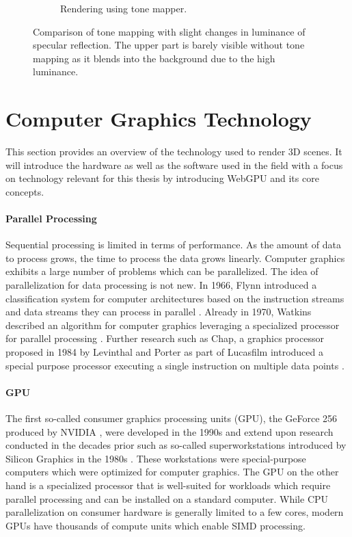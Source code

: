 \begin{figure}[H]
\begin{subfigure}[t]{0.3\textwidth}
    \caption{Rendering using tone mapper.}
    \label{fig:tone-mapping-applied}
  \end{subfigure}
  \hspace*{2cm}
  \caption{Comparison of tone mapping with slight changes in luminance of specular reflection. The upper part is barely visible without tone mapping as it blends into the background due to the high luminance.}
  \label{fig:tone-mapping}
\end{figure}

\section{Computer Graphics Technology}

This section provides an overview of the technology used to render 3D scenes. It will introduce the hardware as well as the software used in the field with a focus on technology relevant for this thesis by introducing WebGPU and its core concepts.

\paragraph{Parallel Processing}

Sequential processing is limited in terms of performance. As the amount of data to process grows, the time to process the data grows linearly. Computer graphics exhibits a large number of problems which can be parallelized. The idea of parallelization for data processing is not new. In 1966, Flynn introduced a classification system for computer architectures based on the instruction streams and data streams they can process in parallel \cite{flynnTaxonomy,flynnTaxonomy2}. Already in 1970, Watkins described an algorithm for computer graphics leveraging a specialized processor for parallel processing \cite{surfaceAlgorithmProcessor}. Further research such as Chap, a  graphics processor proposed in 1984 by Levinthal and Porter as part of Lucasfilm introduced a special purpose processor executing a single instruction on multiple data points \cite{chapSIMDgpu}.

\paragraph{GPU}

The first so-called consumer graphics processing units (\gls{GPU}), the GeForce 256 produced by NVIDIA \cite{evolutionOfGPU}, were developed in the 1990s and extend upon research conducted in the decades prior such as so-called superworkstations introduced by Silicon Graphics in the 1980s \cite{sigWorkstation}. These workstations were special-purpose computers which were optimized for computer graphics. The \gls{GPU} on the other hand is a specialized processor that is well-suited for workloads which require parallel processing and can be installed on a standard computer. While \gls{CPU} parallelization on consumer hardware is generally limited to a few cores, modern \glspl{GPU} have thousands of compute units which enable \gls{SIMD} processing.

